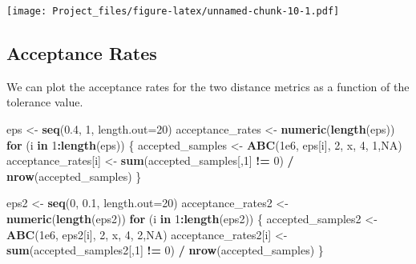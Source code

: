\documentclass[
]{article}
\newenvironment{Shaded}{\begin{snugshade}}{\end{snugshade}}
\newcommand{\AttributeTok}[1]{\textcolor[rgb]{0.13,0.29,0.53}{#1}}
\newcommand{\ConstantTok}[1]{\textcolor[rgb]{0.56,0.35,0.01}{#1}}
\newcommand{\ControlFlowTok}[1]{\textcolor[rgb]{0.13,0.29,0.53}{\textbf{#1}}}
\newcommand{\DecValTok}[1]{\textcolor[rgb]{0.00,0.00,0.81}{#1}}
\newcommand{\FloatTok}[1]{\textcolor[rgb]{0.00,0.00,0.81}{#1}}
\newcommand{\FunctionTok}[1]{\textcolor[rgb]{0.13,0.29,0.53}{\textbf{#1}}}
\newcommand{\NormalTok}[1]{#1}
\newcommand{\OtherTok}[1]{\textcolor[rgb]{0.56,0.35,0.01}{#1}}
\newcommand{\SpecialCharTok}[1]{\textcolor[rgb]{0.81,0.36,0.00}{\textbf{#1}}}
\begin{document}
\texttt{[image: Project\_files/figure-latex/unnamed-chunk-10-1.pdf]}

\subsection{Acceptance Rates}\label{acceptance-rates}

We can plot the acceptance rates for the two distance metrics as a
function of the tolerance value.

\begin{Shaded}
\begin{Highlighting}[]
\NormalTok{eps }\OtherTok{\textless{}{-}} \FunctionTok{seq}\NormalTok{(}\FloatTok{0.4}\NormalTok{, }\DecValTok{1}\NormalTok{, }\AttributeTok{length.out=}\DecValTok{20}\NormalTok{)}
\NormalTok{acceptance\_rates }\OtherTok{\textless{}{-}} \FunctionTok{numeric}\NormalTok{(}\FunctionTok{length}\NormalTok{(eps))}
\ControlFlowTok{for}\NormalTok{ (i }\ControlFlowTok{in} \DecValTok{1}\SpecialCharTok{:}\FunctionTok{length}\NormalTok{(eps)) \{}
\NormalTok{  accepted\_samples }\OtherTok{\textless{}{-}} \FunctionTok{ABC}\NormalTok{(}\FloatTok{1e6}\NormalTok{, eps[i], }\DecValTok{2}\NormalTok{, x, }\DecValTok{4}\NormalTok{, }\DecValTok{1}\NormalTok{,}\ConstantTok{NA}\NormalTok{)}
\NormalTok{  acceptance\_rates[i] }\OtherTok{\textless{}{-}} \FunctionTok{sum}\NormalTok{(accepted\_samples[,}\DecValTok{1}\NormalTok{] }\SpecialCharTok{!=} \DecValTok{0}\NormalTok{) }\SpecialCharTok{/} \FunctionTok{nrow}\NormalTok{(accepted\_samples)}
\NormalTok{\}}
\end{Highlighting}
\end{Shaded}

\begin{Shaded}
\begin{Highlighting}[]
\NormalTok{eps2 }\OtherTok{\textless{}{-}} \FunctionTok{seq}\NormalTok{(}\DecValTok{0}\NormalTok{, }\FloatTok{0.1}\NormalTok{, }\AttributeTok{length.out=}\DecValTok{20}\NormalTok{)}
\NormalTok{acceptance\_rates2 }\OtherTok{\textless{}{-}} \FunctionTok{numeric}\NormalTok{(}\FunctionTok{length}\NormalTok{(eps2))}
\ControlFlowTok{for}\NormalTok{ (i }\ControlFlowTok{in} \DecValTok{1}\SpecialCharTok{:}\FunctionTok{length}\NormalTok{(eps2)) \{}
\NormalTok{  accepted\_samples2 }\OtherTok{\textless{}{-}} \FunctionTok{ABC}\NormalTok{(}\FloatTok{1e6}\NormalTok{, eps2[i], }\DecValTok{2}\NormalTok{, x, }\DecValTok{4}\NormalTok{, }\DecValTok{2}\NormalTok{,}\ConstantTok{NA}\NormalTok{)}
\NormalTok{    acceptance\_rates2[i] }\OtherTok{\textless{}{-}} \FunctionTok{sum}\NormalTok{(accepted\_samples2[,}\DecValTok{1}\NormalTok{] }\SpecialCharTok{!=} \DecValTok{0}\NormalTok{) }\SpecialCharTok{/} \FunctionTok{nrow}\NormalTok{(accepted\_samples)}
\NormalTok{\}}
\end{Highlighting}
\end{Shaded}
\end{document}
